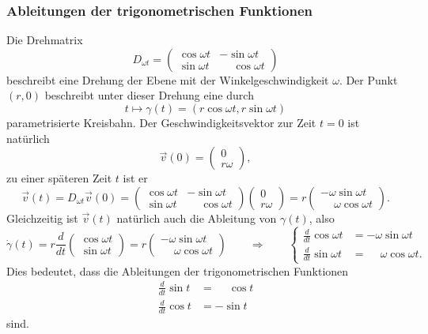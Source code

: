 \subsubsection{Ableitungen der trigonometrischen Funktionen}
%
Die Drehmatrix 
\[
D_{\omega t}
=
\begin{pmatrix}
\cos\omega t&         - \sin\omega t\\
\sin\omega t&\phantom{-}\cos\omega t
\end{pmatrix}
\]
beschreibt eine Drehung der Ebene mit der Winkelgeschwindigkeit 
$\omega$.
Der Punkt $(r,0)$ beschreibt unter dieser Drehung eine
durch 
\[
t \mapsto \gamma(t)=(r\cos\omega t,r\sin\omega t)
\]
parametrisierte Kreisbahn.
%
Der Geschwindigkeitsvektor zur Zeit $t=0$ ist natürlich
\[
\vec{v}(0)
=
\begin{pmatrix}
0\\
r\omega
\end{pmatrix},
\]
zu einer späteren Zeit $t$  ist er
\[
\vec{v}(t)
=
D_{\omega t} \vec{v}(0)
=
\begin{pmatrix}
\cos\omega t&         - \sin\omega t\\
\sin\omega t&\phantom{-}\cos\omega t
\end{pmatrix}
\begin{pmatrix}
0\\r\omega
\end{pmatrix}
=
r
\begin{pmatrix}
         - \omega\sin\omega t\\
\phantom{-}\omega\cos\omega t
\end{pmatrix}.
\]
Gleichzeitig ist $\vec{v}(t)$ natürlich auch die Ableitung  von $\gamma(t)$,
also
\[
\dot{\gamma}(t)
=
r
\frac{d}{dt}
\begin{pmatrix}
\cos\omega t\\
\sin\omega t
\end{pmatrix}
=
r
\begin{pmatrix}
         - \omega\sin\omega t\\
\phantom{-}\omega\cos\omega t
\end{pmatrix}
\qquad\Rightarrow\qquad
\left\{
\begin{aligned}
\frac{d}{dt} \cos\omega t &= -\omega \sin\omega t\\
\frac{d}{dt} \sin\omega t &= \phantom{-} \omega \cos\omega t.
\end{aligned}
\right.
\]
Dies bedeutet, dass die Ableitungen der trigonometrischen Funktionen
\begin{equation}
\begin{aligned}
\frac{d}{dt} \sin t&=\phantom{-}\cos t\\
\frac{d}{dt} \cos t&=-\sin t
\end{aligned}
\label{buch:differentialgleichungen:trigo:ableitungen}
\end{equation}
sind.

